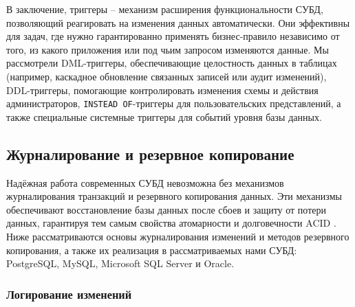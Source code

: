 В заключение, триггеры – механизм расширения функциональности СУБД, позволяющий реагировать на изменения данных автоматически. Они эффективны для задач, где нужно гарантированно применять бизнес-правило независимо от того, из какого приложения или под чьим запросом изменяются данные. Мы рассмотрели DML-триггеры, обеспечивающие целостность данных в таблицах (например, каскадное обновление связанных записей или аудит изменений), DDL-триггеры, помогающие контролировать изменения схемы и действия администраторов, \texttt{INSTEAD OF}-триггеры для пользовательских представлений, а также специальные системные триггеры для событий уровня базы данных. 

\subsection{Журналирование и резервное копирование} 

 Надёжная работа современных СУБД невозможна без механизмов журналирования транзакций и резервного копирования данных. Эти механизмы обеспечивают восстановление базы данных после сбоев и защиту от потери данных, гарантируя тем самым свойства атомарности и долговечности ACID \autocite{Silberschatz}. Ниже рассматриваются основы журналирования изменений и методов резервного копирования, а также их реализация в рассматриваемых нами СУБД: PostgreSQL, MySQL, Microsoft SQL Server и Oracle. 
 
\subsubsection{Логирование изменений} 

